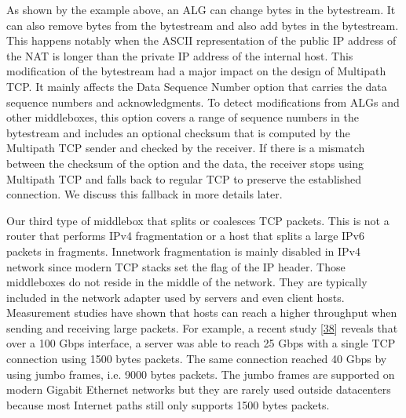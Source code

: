 \documentclass[letterpaper,10pt,english]{sphinxmanual}
\begin{document}
\sphinxAtStartPar
As shown by the example above, an ALG can change bytes in the bytestream. It can also remove bytes from the bytestream and also add bytes in the bytestream. This happens notably when the ASCII representation of the public IP address of the NAT is longer than the private IP address of the internal host. This modification of the bytestream had a major impact on the design of Multipath TCP. It mainly affects the Data Sequence Number option that carries the data sequence numbers and acknowledgments. To detect modifications from ALGs and other middleboxes, this option covers a range of sequence numbers in the bytestream and includes an optional checksum that is computed by the Multipath TCP sender and checked by the receiver. If there is a mismatch between the checksum of the option and the data, the receiver stops using Multipath TCP and falls back to regular TCP to preserve the established connection. We discuss this fallback in more details later.

\sphinxAtStartPar
Our third type of middlebox that splits or coalesces TCP packets. This is not a router that performs IPv4 fragmentation or a host that splits a large IPv6 packets in fragments. In\sphinxhyphen{}network fragmentation is mainly disabled in IPv4 network since modern TCP stacks set the  flag of the IP header. Those middleboxes do not reside in the middle of the network. They are typically included in the network adapter used by servers and even client hosts. Measurement studies have shown that hosts can reach a higher throughput when sending and receiving large packets. For example, a recent study {[}\hyperlink{cite.biblio:id8923}{38}{]} reveals that over a 100 Gbps interface, a server was able to reach 25 Gbps with a single TCP connection using 1500 bytes packets. The same connection reached 40 Gbps by using jumbo frames, i.e. 9000 bytes packets. The jumbo frames are supported on modern Gigabit Ethernet networks but they are rarely used outside datacenters because most Internet paths still only supports 1500 bytes packets.
\end{document}
